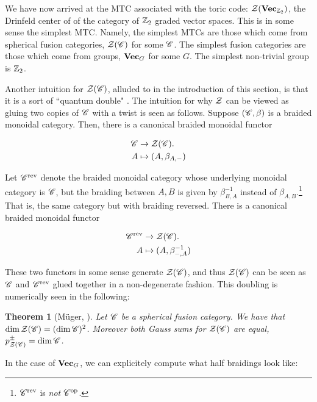\documentclass{article}
\newtheorem{theorem}{Theorem}[section]
\theoremstyle{definition}
\numberwithin{figure}{section}
\begin{document}
We have now arrived at the MTC associated with the toric code: $\mathcal{Z}(\bold{Vec}_{\mathbb{Z}_2})$, the Drinfeld center of of the category of $\mathbb{Z}_2$ graded vector spaces. This is in some sense the simplest MTC. Namely, the simplest MTCs are those which come from spherical fusion categories, $\mathcal{Z}(\mathscr{C})$ for some $\mathscr{C}$. The simplest fusion categories are those which come from groups, $\bold{Vec}_G$ for some $G$. The simplest non-trivial group is $\mathbb{Z}_2$.

Another intuition for $\mathcal{Z}(\mathscr{C})$, alluded to in the introduction of this section, is that it is a sort of ``quantum double" \cite{felice2017hopf}. The intuition for why $\mathcal{Z}$ can be viewed as gluing two copies of $\mathscr{C}$ with a twist is seen as follows. Suppose $(\mathscr{C},\beta)$ is a braided monoidal category. Then, there is a canonical braided monoidal functor

\begin{align*}
\mathscr{C} &\to \mathcal{Z}(\mathscr{C}).\\
A &\mapsto (A,\beta_{A,\--})
\end{align*}

Let $\mathscr{C}^{\text{rev}}$ denote the braided monoidal category whose underlying monoidal category is $\mathscr{C}$, but the braiding between $A,B$ is given by $\beta_{B,A}^{-1}$ instead of $\beta_{A,B}$.\footnote{$\mathscr{C}^{\text{rev}}$ is \textit{not} $\mathscr{C}^{\mathrm{op}}$.} That is, the same category but with braiding reversed. There is a canonical braided monoidal functor

\begin{align*}
\mathscr{C}^{\text{rev}} &\to \mathcal{Z}(\mathscr{C}).\\
A &\mapsto (A,\beta^{-1}_{\--,A})
\end{align*}

These two functors in some sense generate $\mathcal{Z}(\mathscr{C})$, and thus $\mathcal{Z}(\mathscr{C})$ can be seen as $\mathscr{C}$ and $\mathscr{C}^{\text{rev}}$ glued together in a non-degenerate fashion. This doubling is numerically seen in the following:

\begin{theorem}[Müger, \cite{muger2003subfactors}] Let $\mathscr{C}$ be a spherical fusion category. We have that $\dim \mathcal{Z}(\mathscr{C}) = (\dim \mathscr{C})^2$. Moreover both Gauss sums for $\mathcal{Z}(\mathscr{C})$ are equal, $p_{\mathcal{Z}(\mathscr{C})}^{\pm}=\dim \mathscr{C}$.
\end{theorem}

In the case of $\bold{Vec}_G$, we can explicitely compute what half braidings look like:
\end{document}
